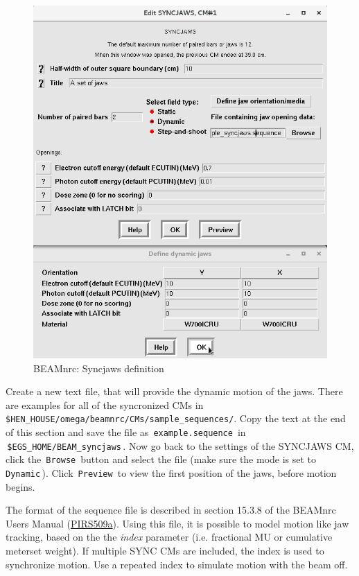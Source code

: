 \documentclass[12pt,twoside]{article}
\begin{document}
\begin{figure}
\begin{center}
\includegraphics[width=5in]{figures/beamnrc_syncjaws}
\caption{BEAMnrc: Syncjaws definition}
\label{fig:beamnrc_syncjaws}
\end{center}
\end{figure}

Create a new text file, that will provide the dynamic motion of the jaws. There are examples for all of the syncronized CMs in \,\Verb|$HEN_HOUSE/omega/beamnrc/CMs/sample_sequences/|. Copy the text at the end of this section and save the file as \,\Verb|example.sequence|\, in \\
\,\Verb|$EGS_HOME/BEAM_syncjaws|\,. Now go back to the settings of the SYNCJAWS CM, click the \,\Verb|Browse|\, button and select the file (make sure the mode is set to \,\Verb|Dynamic|\,). Click \,\Verb|Preview|\, to view the first position of the jaws, before motion begins.

The format of the sequence file is described in section 15.3.8 of the BEAMnrc Users Manual (\href{https://nrc-cnrc.github.io/EGSnrc/doc/pirs509a-beamnrc.pdf}{PIRS509a}). Using this file, it is possible to model motion like jaw tracking, based on the the \textit{index} parameter (i.e. fractional MU or cumulative meterset weight). If multiple SYNC CMs are included, the index is used to synchronize motion. Use a repeated index to simulate motion with the beam off.
\end{document}
